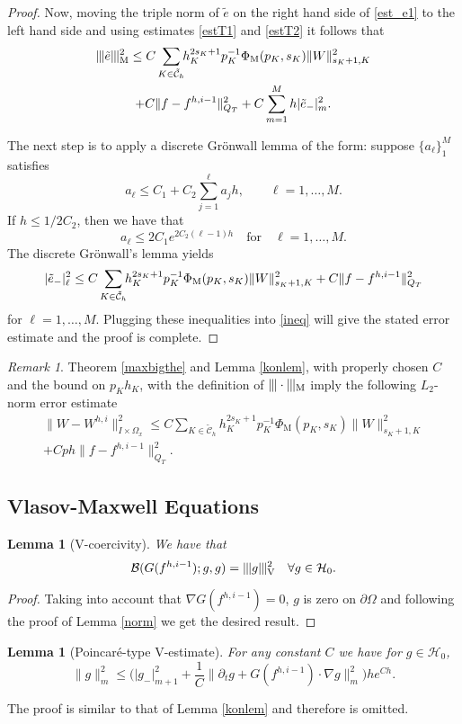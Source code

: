 \documentclass[reqno,a4paper]{amsart}
\newtheorem{lemma}[theorem]{Lemma}
\theoremstyle{remark}
\newtheorem{remark}[theorem]{Remark}
\numberwithin{equation}{section}
\newcommand{\Mnorm}[1]{|\mkern-1mu|\mkern-1mu|#1|\mkern-1mu|\mkern-1mu|_\mathrm{M}}
\newcommand{\Vnorm}[1]{|\mkern-1mu|\mkern-1mu|#1|\mkern-1mu|\mkern-1mu|_\mathrm{V}}
\def\d{\partial}
\def\B{\mathcal{B}}
\def\et{\tilde{e}}
\def\sumK{\sum_{K\in\mathcal{\tilde{C}}_h}\!\!}
\begin{document}
\begin{proof}
Now, moving the triple norm of $\et$ on the right hand side of \eqref{est_e1}
to the left hand side and using estimates \eqref{estT1} and \eqref{estT2}
it follows that
\begin{multline} \label{ineq}
\Mnorm{\et}^2 \leq
C\sumK h_K^{2s_K+1}p_K^{-1}\Phi_\mathrm{M}(p_K,s_K)\|W\|^2_{s_K+1,K}\\
+ C \| f-f^{h,i-1} \|^2_{Q_T} + C \sum_{m=1}^M h | \et_- |^2_m .
\end{multline}

The next step is to apply a discrete Gr\"onwall lemma of the form:
suppose $ \{ a_\ell \}^M_1 $ satisfies
\[
a_\ell \leq C_1 + C_2 \sum_{j=1}^\ell a_j h,\qquad \ell= 1, \ldots , M.
\]
If $ h \leq 1/2 C_2 $, then we have that 
\[
a_\ell \leq 2 C_1 e^{2C_2 (\ell-1)h} \quad \mbox{for} 
\quad  \ell=1, \ldots , M .
\]
The discrete Gr\"onwall's lemma yields
\[
|\et_-|^2_\ell \leq
C\sumK h_K^{2s_K+1}p_K^{-1}\Phi_\mathrm{M}(p_K,s_K)\|W\|^2_{s_K+1,K}\\
+ C \| f-f^{h,i-1} \|^2_{Q_T}
\]
for $ \ell = 1, \ldots , M $. Plugging these inequalities into \eqref{ineq}
will give the stated error estimate and the proof is complete. 
\end{proof}
\begin{remark}
Theorem \ref{maxbigthe} and Lemma \ref{konlem}, with properly chosen $C$
and the bound on $p_Kh_K$, with the definition of $\Mnorm{\cdot}$
imply the following $L_2$-norm error estimate
\begin{multline} \label{maxl2}
\|W-W^{h,i}\|^2_{I\times\Omega_x} \leq 
C\!\!\sumK h_K^{2s_K+1}p_K^{-1}\Phi_\mathrm{M}(p_K,s_K)\|W\|^2_{s_K+1,K}\\
+ Cph\|f-f^{h,i-1}\|^2_{Q_T}.
\end{multline}
\end{remark}

\subsection{Vlasov-Maxwell Equations}

\begin{lemma} [V-coercivity] \label{Vstab}
We have that
\[
\B ( G(f^{h,i-1} ); g, g) = \Vnorm{g}^2 \quad\forall g \in \mathcal{H}_0.
\]
\end{lemma}
\begin{proof}
Taking into account that $\nabla G(f^{h,i-1}) = 0$, $g$ is zero on 
$\d\Omega$ and
following the proof of Lemma \ref{norm} we get the desired result.
\end{proof}
\begin{lemma} [Poincar\'e-type V-estimate] \label{V2normest}
For any constant $ C $ we have for $ g \in \mathcal{H}_0 $,
\[
\|g\|^2_m \leq\Big( |g_-|^2_{m+1}
+\frac{1}{C}\|\d_t g+G(f^{h,i-1})\cdot\nabla g\|^2_m
 \Big) he^{Ch} .
\]
\end{lemma}
The proof is similar to that of Lemma \ref{konlem} and therefore is 
omitted.
\end{document}
